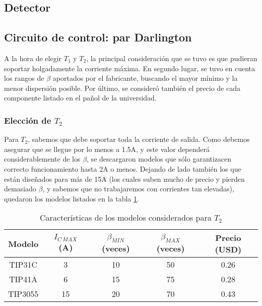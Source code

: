 \documentclass[e2_tp1_main.tex]{subfiles}
\begin{document}
\subsection{Detector}



\subsection{Circuito de control: par Darlington}

A la hora de elegir $T_1$ y $T_2$, la principal consideraci\'on que se tuvo es que pudieran soportar holgadamente la corriente m\'axima. En segundo lugar, se tuvo en cuenta los rangos de $\beta$ aportados por el fabricante, buscando el mayor m\'inimo y la menor dispersi\'on posible. Por \'ultimo, se consider\'o tambi\'en el precio de cada componente listado en el pa\~nol de la universidad.


\subsubsection{Elecci\'on de $T_2$}

Para $T_2$, sabemos que debe soportar toda la corriente de salida. Como debemos asegurar que se llegue por lo menos a 1.5A, y este valor depender\'a considerablemente de los $\beta$, se descargaron modelos que s\'olo garantizacen correcto funcionamiento hasta 2A o menos. Dejando de lado tambi\'en los que est\'an dise\~nados para m\'as de 15A (los cuales suben mucho de precio y pierden demasiado $\beta$, y sabemos que no trabajaremos con corrientes tan elevadas), quedaron los modelos listados en la tabla \ref{table:modelos-t2}.

\begin{table}[ht!]
	\centering
	\begin{tabular}{|c|c|c|c|c|}
		\hline 
		Modelo & $I_{C\, MAX}$ (A) & $\beta_{MIN}$ (veces) & $\beta_{MAX}$ (veces) & Precio (USD) \\ 
		\hline \hline
		TIP31C & 3 & 10 & 50 & 0.26 \\ 
		\hline 
		TIP41A & 6 & 15 & 75 & 0.28 \\ 
		\hline 
		TIP3055 & 15 & 20 & 70 & 0.43 \\ 
		\hline 
		\end{tabular} 	
	\caption{Caracter\'isticas de los modelos considerados para $T_2$}
	\label{table:modelos-t2}
\end{table}
\end{document}
